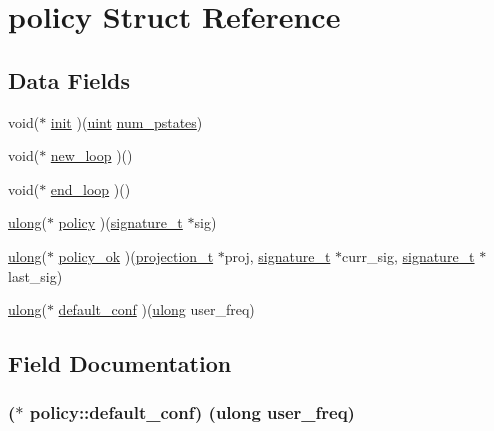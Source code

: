 \hypertarget{structpolicy}{}\section{policy Struct Reference}
\label{structpolicy}
\subsection*{Data Fields}
\begin{DoxyCompactItemize}
\item 
void($\ast$ \hyperlink{structpolicy_ade5ad6f0239e34d13826497fd72d917e}{init} )(\hyperlink{generic_8h_a91ad9478d81a7aaf2593e8d9c3d06a14}{uint} \hyperlink{translate__coefficients_8c_abda44c9fa99beca77378f1e2b24aff31}{num\+\_\+pstates})
\item 
void($\ast$ \hyperlink{structpolicy_a9bb8e49f1796876238623460ff349ebf}{new\+\_\+loop} )()
\item 
void($\ast$ \hyperlink{structpolicy_a2e7ced29d27efca9a3d90ffc8fe0226e}{end\+\_\+loop} )()
\item 
\hyperlink{generic_8h_a718b4eb2652c286f4d42dc18a8e71a1a}{ulong}($\ast$ \hyperlink{structpolicy_a9c08472eff148dd22c31f1b733dfed60}{policy} )(\hyperlink{signature_8h_a3387c90f9aa9243c926866ee8ce61917}{signature\+\_\+t} $\ast$sig)
\item 
\hyperlink{generic_8h_a718b4eb2652c286f4d42dc18a8e71a1a}{ulong}($\ast$ \hyperlink{structpolicy_a5be97c21f646a597063e280cbcaec128}{policy\+\_\+ok} )(\hyperlink{projection_8h_a50fc11780fbb9af29b37d325d803a2da}{projection\+\_\+t} $\ast$proj, \hyperlink{signature_8h_a3387c90f9aa9243c926866ee8ce61917}{signature\+\_\+t} $\ast$curr\+\_\+sig, \hyperlink{signature_8h_a3387c90f9aa9243c926866ee8ce61917}{signature\+\_\+t} $\ast$last\+\_\+sig)
\item 
\hyperlink{generic_8h_a718b4eb2652c286f4d42dc18a8e71a1a}{ulong}($\ast$ \hyperlink{structpolicy_a647e41f22ae624084b0082721c013400}{default\+\_\+conf} )(\hyperlink{generic_8h_a718b4eb2652c286f4d42dc18a8e71a1a}{ulong} user\+\_\+freq)
\end{DoxyCompactItemize}


\subsection{Field Documentation}
\subsubsection[{\texorpdfstring{default\+\_\+conf}{default_conf}}]{($\ast$ policy\+::default\+\_\+conf) ({\bf ulong} user\+\_\+freq)}\hypertarget{structpolicy_a647e41f22ae624084b0082721c013400}{}\label{structpolicy_a647e41f22ae624084b0082721c013400}
